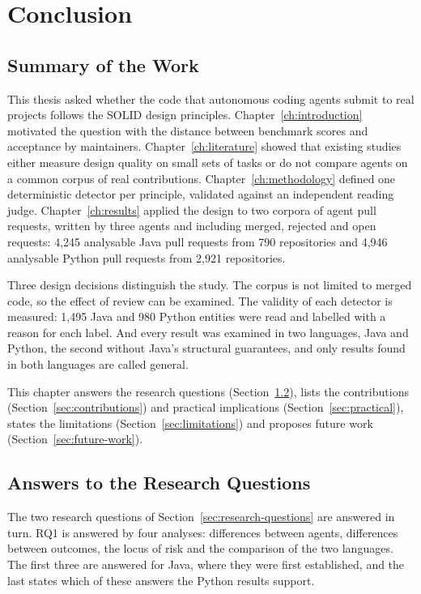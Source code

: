 \chapter{Conclusion}
\label{ch:conclusion}
\newpage

\section{Summary of the Work}
\label{sec:ch5-summary}

This thesis asked whether the code that autonomous coding agents submit to real projects follows the
SOLID design principles. Chapter~\ref{ch:introduction} motivated the question with the distance
between benchmark scores and acceptance by maintainers. Chapter~\ref{ch:literature} showed that
existing studies either measure design quality on small sets of tasks or do not compare agents on a
common corpus of real contributions. Chapter~\ref{ch:methodology} defined one deterministic detector
per principle, validated against an independent reading judge. Chapter~\ref{ch:results} applied the
design to two corpora of agent pull requests, written by three agents and including merged, rejected
and open requests: 4{,}245 analysable Java pull requests from 790 repositories and 4{,}946
analysable Python pull requests from 2{,}921 repositories.

Three design decisions distinguish the study. The corpus is not limited to merged code, so the effect
of review can be examined. The validity of each detector is measured: 1{,}495 Java and 980 Python
entities were read and labelled with a reason for each label. And every result was examined in two
languages, Java and Python, the second without Java's structural guarantees, and only results found
in both languages are called general.

This chapter answers the research questions (Section~\ref{sec:rq-answers}), lists the contributions
(Section~\ref{sec:contributions}) and practical implications (Section~\ref{sec:practical}), states
the limitations (Section~\ref{sec:limitations}) and proposes future work
(Section~\ref{sec:future-work}).

\section{Answers to the Research Questions}
\label{sec:rq-answers}

The two research questions of Section~\ref{sec:research-questions} are answered in turn. RQ1 is
answered by four analyses: differences between agents, differences between outcomes, the locus of
risk and the comparison of the two languages. The first three are answered for Java, where they were
first established, and the last states which of these answers the Python results support.

